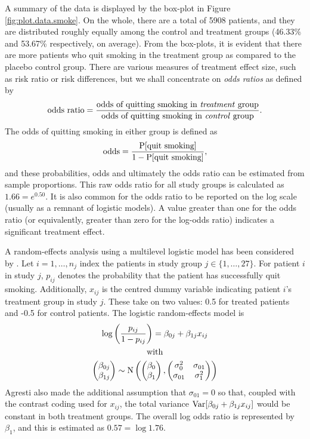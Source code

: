 \documentclass[a4paper,showframe,11pt]{report}\usepackage[]{graphicx}\usepackage[]{color}
\begin{document}
A summary of the data is displayed by the box-plot in Figure \ref{fig:plot.data.smoke}.
On the whole, there are a total of 5908 patients, and they are distributed roughly equally among the control and treatment groups (46.33\% and 53.67\% respectively, on average).
From the box-plots, it is evident that there are more patients who quit smoking in the treatment group as compared to the placebo control group.
There are various measures of treatment effect size, such as risk ratio or risk differences, but we shall concentrate on \emph{odds ratios} as defined by
\[
  \text{odds ratio} = \frac{\text{odds of quitting smoking in \emph{treatment} group}}
  {\text{odds of quitting smoking in \emph{control} group}}.
\]
The odds of quitting smoking in either group is defined as
\[
  \text{odds} = \frac{\operatorname{P}[\text{quit smoking}]}{1 - \operatorname{P}[\text{quit smoking}]},
\]
and these probabilities, odds and ultimately the odds ratio can be estimated from sample proportions.
This raw odds ratio for all study groups is calculated as $1.66 = e^{0.50}$.
It is also common for the odds ratio to be reported on the log scale (usually as a remnant of logistic models).
A value greater than one for the odds ratio (or equivalently, greater than zero for the log-odds ratio) indicates a significant treatment effect.

A random-effects analysis using a multilevel logistic model has been considered by .
Let $i=1,\dots,n_j$ index the patients in study group $j \in \{1,\dots,27\}$.
For patient $i$ in study $j$, $p_{ij}$ denotes the probability that the patient has successfully quit smoking.
Additionally, $x_{ij}$ is the centred dummy variable indicating patient $i$'s treatment group in study $j$.
These take on two values: 0.5 for treated patients and -0.5 for control patients.
The logistic random-effects model is
\begin{gather*}
  \log \left( \frac{p_{ij}}{1-p_{ij}} \right) = \beta_{0j} + \beta_{1j}x_{ij} \\
  \text{with} \\
  \begin{pmatrix} \beta_{0j} \\ \beta_{1j} \end{pmatrix}
  \sim \operatorname{N} \left(
  \begin{pmatrix} \beta_0 \\ \beta_1 \end{pmatrix},
  \begin{pmatrix} \sigma_0^2 & \sigma_{01} \\ \sigma_{01} & \sigma_1^2 \\ \end{pmatrix}
  \right)
\end{gather*}
Agresti also made the additional assumption that $\sigma_{01} = 0$ so that, coupled with the contrast coding used for $x_{ij}$, the total variance $\operatorname{Var}[\beta_{0j} + \beta_{1j}x_{ij}]$ would be constant in both treatment groups.
The overall log odds ratio is represented by $\beta_1$, and this is estimated as $0.57 = \log 1.76$.
\end{document}
